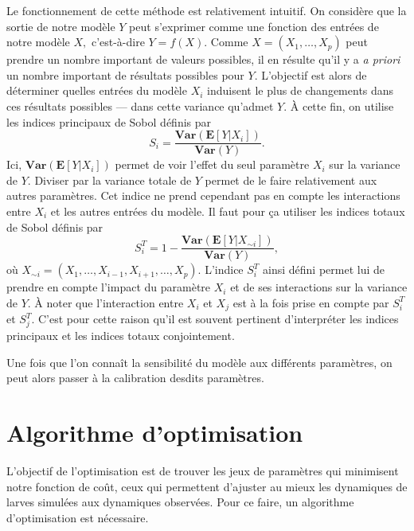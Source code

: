 Le fonctionnement de cette méthode est relativement intuitif.
On considère que la sortie de notre modèle $Y$ peut s'exprimer comme une fonction des entrées de notre modèle $X,$ c'est-à-dire $Y = f(X)$.
Comme $X = \left( X_1, \ldots, X_p \right)$ peut prendre un nombre important de valeurs possibles, il en résulte qu'il y a \emph{a priori} un nombre important de résultats possibles pour $Y.$
L'objectif est alors de déterminer quelles entrées du modèle $X_i$ induisent le plus de changements dans ces résultats possibles --- dans cette variance qu'admet $Y.$
À cette fin, on utilise les indices principaux de Sobol définis par
\[
S_i = \frac{\textbf{Var}\!\left( \mathbf{E}\!\left[Y|X_i\right] \right)}{\textbf{Var}\!\left( Y \right)}.
\]
Ici, $\textbf{Var}\!\left( \mathbf{E}\left[Y|X_i\right] \right)$ permet de voir l'effet du seul paramètre $X_i$ sur la variance de $Y.$
Diviser par la variance totale de $Y$ permet de le faire relativement aux autres paramètres.
Cet indice ne prend cependant pas en compte les interactions entre $X_i$ et les autres entrées du modèle. 
Il faut pour ça utiliser les indices totaux de Sobol définis par
\[
S^T_i = 1 - \frac{\textbf{Var}\!\left( \mathbf{E}\!\left[Y|X_{\sim i}\right] \right)}{\textbf{Var}\!\left( Y \right)},
\]
où $X_{\sim i} = \left(X_1, \ldots, X_{i-1}, X_{i+1}, \ldots, X_p \right)$.
L'indice $S^T_i$ ainsi défini permet lui de prendre en compte l'impact du paramètre $X_i$ et de ses interactions sur la variance de $Y$.
À noter que l'interaction entre $X_i$ et $X_j$ est à la fois prise en compte par $S^T_i$ et $S^T_j$.
C'est pour cette raison qu'il est souvent pertinent d'interpréter les indices principaux et les indices totaux conjointement.

Une fois que l'on connaît la sensibilité du modèle aux différents paramètres, on peut alors passer à la calibration desdits paramètres.


\section{Algorithme d'optimisation}

L'objectif de l'optimisation est de trouver les jeux de paramètres qui minimisent notre fonction de coût, ceux qui permettent d'ajuster au mieux les dynamiques de larves simulées aux dynamiques observées.
Pour ce faire, un algorithme d'optimisation est nécessaire.


